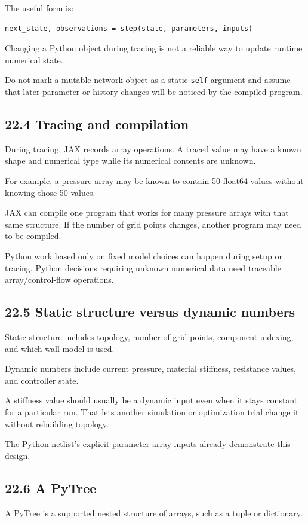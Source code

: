 \documentclass[11pt,a4paper]{article}
\begin{document}
The useful form is:


\begin{lstlisting}
next_state, observations = step(state, parameters, inputs)
\end{lstlisting}
Changing a Python object during tracing is not a reliable way to update runtime numerical state.

Do not mark a mutable network object as a static \texttt{self} argument and assume that later parameter or history changes will be noticed by the compiled program.

\subsection{22.4 Tracing and compilation}
During tracing, JAX records array operations. A traced value may have a known shape and numerical type while its numerical contents are unknown.

For example, a pressure array may be known to contain 50 float64 values without knowing those 50 values.

JAX can compile one program that works for many pressure arrays with that same structure. If the number of grid points changes, another program may need to be compiled.

Python work based only on fixed model choices can happen during setup or tracing. Python decisions requiring unknown numerical data need traceable array/control-flow operations.

\subsection{22.5 Static structure versus dynamic numbers}
Static structure includes topology, number of grid points, component indexing, and which wall model is used.

Dynamic numbers include current pressure, material stiffness, resistance values, and controller state.

A stiffness value should usually be a dynamic input even when it stays constant for a particular run. That lets another simulation or optimization trial change it without rebuilding topology.

The Python netlist's explicit parameter-array inputs already demonstrate this design.

\subsection{22.6 A PyTree}
A PyTree is a supported nested structure of arrays, such as a tuple or dictionary.
\end{document}
